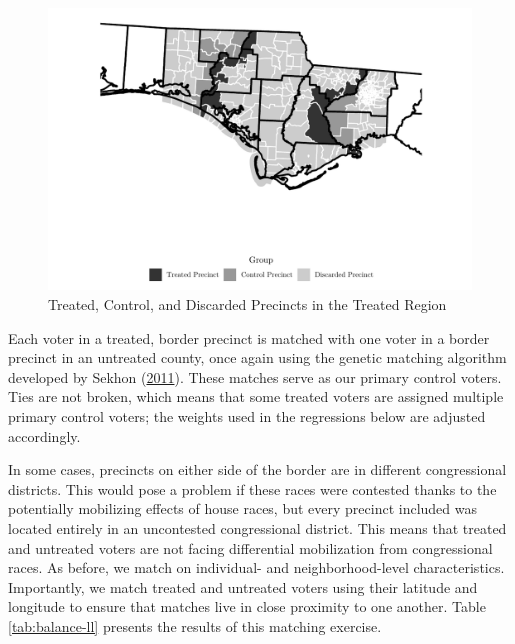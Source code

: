 \documentclass[
  12pt,
]{article}
\begin{document}
\begin{figure}[H]

{\centering \includegraphics{hurricane_michael_files/figure-latex/map-chunk-1} 

}

\caption{\label{fig:map}Treated, Control, and Discarded Precincts in the Treated Region}\label{fig:map-chunk}
\end{figure}

Each voter in a treated, border precinct is matched with one voter in a border precinct in an untreated county, once again using the genetic matching algorithm developed by Sekhon (\protect\hyperlink{ref-Sekhon2011}{2011}). These matches serve as our primary control voters. Ties are not broken, which means that some treated voters are assigned multiple primary control voters; the weights used in the regressions below are adjusted accordingly.

In some cases, precincts on either side of the border are in different congressional districts. This would pose a problem if these races were contested thanks to the potentially mobilizing effects of house races, but every precinct included was located entirely in an uncontested congressional district. This means that treated and untreated voters are not facing differential mobilization from congressional races. As before, we match on individual- and neighborhood-level characteristics. Importantly, we match treated and untreated voters using their latitude and longitude to ensure that matches live in close proximity to one another. Table \ref{tab:balance-ll} presents the results of this matching exercise.
\end{document}
